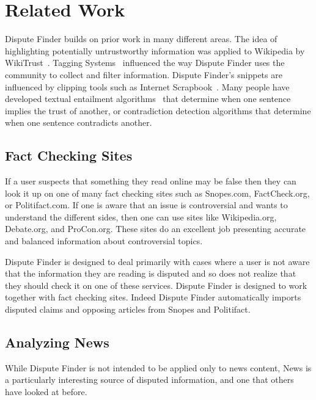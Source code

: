 \documentclass{www2010-submission}
\newcommand{\todo}[1]{}
\begin{document}
\todo{Should we explicitly list what we think are our key contributions?}


\section{Related Work}

Dispute Finder builds on prior work in many different areas. The idea of highlighting potentially untrustworthy information was applied to Wikipedia by WikiTrust~\cite{Adler2008a}. Tagging Systems~\cite{Marlow2006} influenced the way Dispute Finder uses the community to collect and filter information. Dispute Finder's snippets are influenced by clipping tools such as Internet Scrapbook~\cite{Sugiura1998}. Many people have developed textual entailment algorithms~\cite{entail?} that determine when one sentence implies the trust of another, or contradiction detection algorithms that determine when one sentence contradicts another.

\todo{Add more references from the NewsCube paper}

\subsection{Fact Checking Sites}

If a user suspects that something they read online may be false then they can look it up on one of many fact checking sites such as Snopes.com, FactCheck.org, or Politifact.com. If one is aware that an issue is controversial and wants to understand the different sides, then one can use sites like Wikipedia.org, Debate.org, and ProCon.org. These sites do an excellent job presenting accurate and balanced information about controversial topics. 

Dispute Finder is designed to deal primarily with cases where a user is not aware that the information they are reading is disputed and so does not realize that they should check it on one of these services. Dispute Finder is designed to work together with fact checking sites. Indeed Dispute Finder automatically imports disputed claims and opposing articles from Snopes and Politifact.

\subsection{Analyzing News}

While Dispute Finder is not intended to be applied only to news content, News is a particularly interesting source of disputed information, and one that others have looked at before. 
\end{document}
